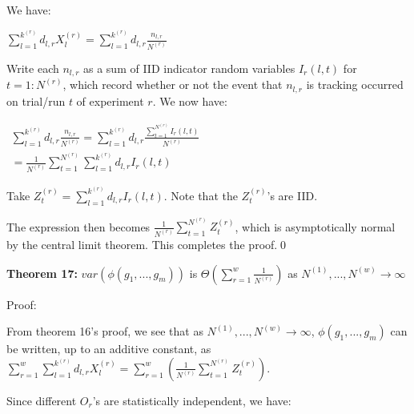 \documentclass{article}
\begin{document}
We have:

$\displaystyle \sum _{l=1}^{k^{\left( r\right)}} d_{l,r} X_{l}^{\left( r\right)} =\sum _{l=1}^{k^{\left( r\right)}} d_{l,r}\frac{n_{l,r}}{N^{\left( r\right)}}$

Write each $\displaystyle n_{l,r}$ as a sum of IID indicator random variables $\displaystyle I_{r}\left( l,t\right)$ for $\displaystyle t=1:N^{\left( r\right)}$, which record whether or not the event that $\displaystyle n_{l,r}$ is tracking occurred on trial/run $\displaystyle t$ of experiment $\displaystyle r$. We now have:

$\displaystyle  \begin{array}{l}
\sum _{l=1}^{k^{\left( r\right)}} d_{l,r}\frac{n_{l,r}}{N^{\left( r\right)}} =\sum _{l=1}^{k^{\left( r\right)}} d_{l,r}\frac{\sum _{t=1}^{N^{\left( r\right)}} I_{r}\left( l,t\right)}{N^{\left( r\right)}}\\
=\frac{1}{N^{\left( r\right)}}\sum _{t=1}^{N^{\left( r\right)}}\sum _{l=1}^{k^{\left( r\right)}} d_{l,r} I_{r}\left( l,t\right)
\end{array}$

Take $\displaystyle Z_{t}^{\left( r\right)} =\sum _{l=1}^{k^{\left( r\right)}} d_{l,r} I_{r}\left( l,t\right)$. Note that the $\displaystyle Z_{t}^{\left( r\right)}$'s are IID.

The expression then becomes $\displaystyle \frac{1}{N^{\left( r\right)}}\sum _{t=1}^{N^{\left( r\right)}} Z_{t}^{\left( r\right)}$, which is asymptotically normal by the central limit theorem. This completes the proof.\qed 



\textbf{Theorem 17: }$\displaystyle var\left( \phi \left( g_{1} ,...,g_{m}\right)\right)$ is $\displaystyle \Theta \left(\sum _{r=1}^{w}\frac{1}{N^{\left( r\right)}}\right)$ as $\displaystyle N^{\left( 1\right)} ,...,N^{\left( w\right)}\rightarrow \infty $

Proof:

From theorem 16's proof, we see that as $\displaystyle N^{\left( 1\right)} ,...,N^{\left( w\right)}\rightarrow \infty $, $\displaystyle \phi \left( g_{1} ,...,g_{m}\right)$ can be written, up to an additive constant, as $\displaystyle \sum _{r=1}^{w}\sum _{l=1}^{k^{\left( r\right)}} d_{l,r} X_{l}^{\left( r\right)} =\sum _{r=1}^{w}\left(\frac{1}{N^{\left( r\right)}}\sum _{t=1}^{N^{\left( r\right)}} Z_{t}^{\left( r\right)}\right)$.

Since different $\displaystyle O_{r}$'s are statistically independent, we have:
\end{document}
